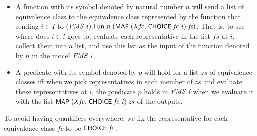 \documentclass[letterpaper]{article}
\renewcommand{\HOLConst}[1]{{\textsf{\upshape\small #1}}}
\renewcommand{\HOLinline}[1]{\ensuremath{#1}}
\begin{document}
\begin{itemize}
\item A function with its symbol denoted by natural number $n$ will send a list of equivalence class to the equivalence class represented by the function that sending $i\in I$ to \HOLinline{(\HOLFreeVar{FMS}\;\HOLFreeVar{i}).\HOLFieldName{Fun}\;\HOLFreeVar{n}\;(\HOLConst{MAP}\;(\HOLTokenLambda{}\HOLBoundVar{fc}.\;\HOLConst{CHOICE}\;\HOLBoundVar{fc}\;\HOLFreeVar{i})\;\HOLFreeVar{fs})}. That is, to see where does $i\in I$ goes to, evaluate each representative in the list $fs$ at $i$, collect them into a list, and use this list as the input of the function denoted by $n$ in the model \HOLinline{\HOLFreeVar{FMS}\;\HOLFreeVar{i}}.

\item A predicate with its symbol denoted by $p$ will hold for a list $zs$ of equivalence classes iff when we pick representatives in each member of $zs$ and evaluate these representatives at $i$, the predicate $p$ holds in \HOLinline{\HOLFreeVar{FMS}\;\HOLFreeVar{i}} when we evaluate it with the list \HOLinline{\HOLConst{MAP}\;(\HOLTokenLambda{}\HOLBoundVar{fc}.\;\HOLConst{CHOICE}\;\HOLBoundVar{fc}\;\HOLFreeVar{i})\;\HOLFreeVar{zs}} of the outputs. 
\end{itemize}

To avoid having quantifiers everywhere, we fix the representative for each equivalence class $fc$ to be \HOLinline{\HOLConst{CHOICE}\;\HOLFreeVar{fc}}.
\end{document}
